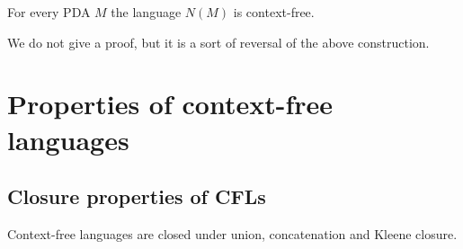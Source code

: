 \begin{page}
\setcounter{section}{6}
\setcounter{subsection}{4}
\setcounter{dfn}{11}
\label{portion:1144}

\begin{thm}
For every PDA $M$ the language $N(M)$ is context-free.
\end{thm}

\end{page}

\begin{page}
\setcounter{section}{7}
\setcounter{subsection}{0}
\setcounter{dfn}{11}
\label{portion:1145}

We do not give a proof, but it is a sort of reversal of the above construction.






\end{page}

\begin{page}
\setcounter{section}{7}
\setcounter{subsection}{1}
\setcounter{dfn}{0}
\label{portion:1146}

\section{Properties of context-free languages}

\end{page}

\begin{page}
\setcounter{section}{7}
\setcounter{subsection}{1}
\setcounter{dfn}{0}
\label{portion:1147}

\subsection{Closure properties of CFLs}

\end{page}

\begin{page}
\setcounter{section}{7}
\setcounter{subsection}{1}
\setcounter{dfn}{1}
\label{portion:1149}

\begin{thm}
\label{thm:CFLClosed}
Context-free languages are closed under union, concatenation and Kleene closure.
\end{thm}

\end{page}

